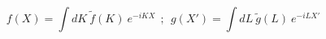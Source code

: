 \begin{equation}\label{eq272:ps}
  f(X)=\int dK~\tilde{f}(K)~ e^{-iKX}~~;~~
  g(X')=\int dL~\tilde{g}(L)~ e^{-iLX'}
\end{equation}

